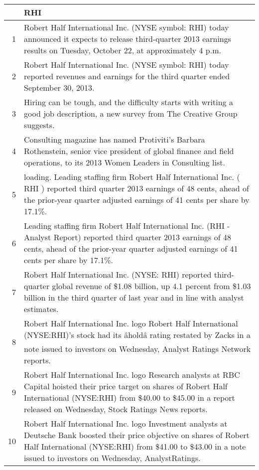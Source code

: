 \documentclass{tufte-handout}\usepackage[]{graphicx}\usepackage[]{color}
\begin{document}
\begin{tabularx}{\textwidth}{rX}
  \hline
 & RHI \\ 
  \hline
1 &  Robert Half International Inc. (NYSE symbol: RHI) today announced it expects to release third-quarter 2013 earnings results on Tuesday, October 22, at approximately 4 p.m.  \\ 
  2 &  Robert Half International Inc. (NYSE symbol: RHI) today reported revenues and earnings for the third quarter ended September 30, 2013.  \\ 
  3 &  Hiring can be tough, and the difficulty starts with writing a good job description, a new survey from The Creative Group suggests.  \\ 
  4 &  Consulting magazine has named Protiviti's Barbara Rothenstein, senior vice president of global finance and field operations, to its 2013 Women Leaders in Consulting list.  \\ 
  5 &  loading. Leading staffing firm Robert Half International Inc. ( RHI ) reported third quarter 2013 earnings of 48 cents, ahead of the prior-year quarter adjusted earnings of 41 cents per share by 17.1\%.  \\ 
  6 &  Leading staffing firm Robert Half International Inc. (RHI - Analyst Report) reported third quarter 2013 earnings of 48 cents, ahead of the prior-year quarter adjusted earnings of 41 cents per share by 17.1\%.  \\ 
  7 &  Robert Half International Inc. (NYSE: RHI) reported third-quarter global revenue of \$1.08 billion, up 4.1 percent from \$1.03 billion in the third quarter of last year and in line with analyst estimates.  \\ 
  8 &  Robert Half International Inc. logo Robert Half International (NYSE:RHI)'s stock had its âholdâ rating restated by Zacks in a note issued to investors on Wednesday, Analyst Ratings Network reports.  \\ 
  9 &  Robert Half International Inc. logo Research analysts at RBC Capital hoisted their price target on shares of Robert Half International (NYSE:RHI) from \$40.00 to \$45.00 in a report released on Wednesday, Stock Ratings News reports.  \\ 
  10 &  Robert Half International Inc. logo Investment analysts at Deutsche Bank boosted their price objective on shares of Robert Half International (NYSE:RHI) from \$41.00 to \$43.00 in a note issued to investors on Wednesday, AnalystRatings.  \\ 
   \hline
\end{tabularx}
\end{document}

